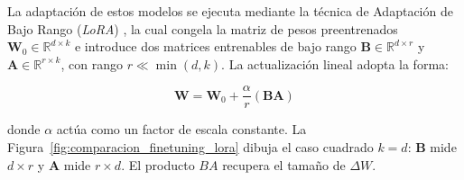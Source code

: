 La adaptación de estos modelos se ejecuta mediante la técnica de Adaptación de Bajo Rango (\textit{LoRA}) \parencite{hu2022lora}, la cual congela la matriz de pesos preentrenados $\mathbf{W}_0 \in \mathbb{R}^{d \times k}$ e introduce dos matrices entrenables de bajo rango $\mathbf{B} \in \mathbb{R}^{d \times r}$ y $\mathbf{A} \in \mathbb{R}^{r \times k}$, con rango $r \ll \min(d, k)$. La actualización lineal adopta la forma:

\begin{equation}
\mathbf{W} = \mathbf{W}_0 + \frac{\alpha}{r}(\mathbf{B}\mathbf{A})
\label{eq:lora_formulation}
\end{equation}

donde $\alpha$ actúa como un factor de escala constante. La Figura~\ref{fig:comparacion_finetuning_lora} dibuja el caso cuadrado $k = d$: $\mathbf{B}$ mide $d \times r$ y $\mathbf{A}$ mide $r \times d$. El producto $BA$ recupera el tamaño de $\Delta W$.

